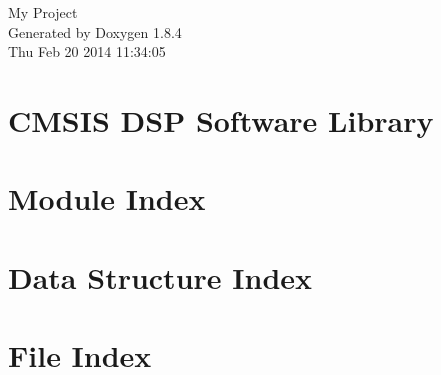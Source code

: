 \documentclass[twoside]{book}
\newcommand{\clearemptydoublepage}{%
  \newpage{\pagestyle{empty}\cleardoublepage}%
}
\begin{document}
\hypersetup{pageanchor=false}
\begin{titlepage}
\vspace*{7cm}
\begin{center}%
{\Large My Project }\\
\vspace*{1cm}
{\large Generated by Doxygen 1.8.4}\\
\vspace*{0.5cm}
{\small Thu Feb 20 2014 11:34:05}\\
\end{center}
\end{titlepage}
\clearemptydoublepage
\tableofcontents
\clearemptydoublepage
{}
\hypersetup{pageanchor=true}

\chapter{C\-M\-S\-I\-S D\-S\-P Software Library}
\label{index}\hypertarget{index}{}
\chapter{Module Index}

\chapter{Data Structure Index}

\chapter{File Index}

\end{document}
